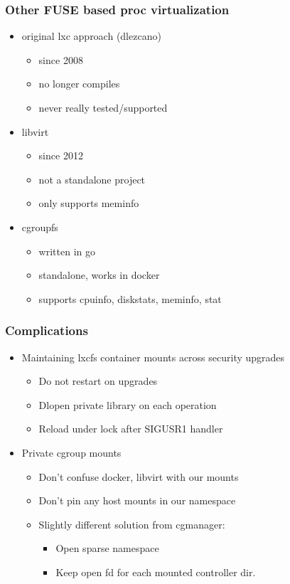 \documentclass{beamer}
\begin{document}
\begin{frame}
\frametitle{Other FUSE based proc virtualization}
	\begin{itemize}
	\item original lxc approach (dlezcano)
		\begin{itemize}
		\item since 2008
		\item no longer compiles
		\item never really tested/supported
		\end{itemize}
	\item libvirt
		\begin{itemize}
		\item since 2012
		\item not a standalone project
		\item only supports meminfo
		\end{itemize}
	\item cgroupfs
		\begin{itemize}
		\item written in go
		\item standalone, works in docker
		\item supports cpuinfo, diskstats, meminfo, stat
		\end{itemize}
	\end{itemize}
\end{frame}

\begin{frame}
\frametitle{Complications}
	\begin{itemize}
	\item Maintaining lxcfs container mounts across security upgrades
		\begin{itemize}
		\item Do not restart on upgrades
		\item Dlopen private library on each operation
		\item Reload under lock after SIGUSR1 handler
		\end{itemize}
	\item Private cgroup mounts
		\begin{itemize}
		\item Don't confuse docker, libvirt with our mounts
		\item Don't pin any host mounts in our namespace
		\item Slightly different solution from cgmanager:
			\begin{itemize}
			\item Open sparse namespace
			\item Keep open fd for each mounted controller dir.
			\end{itemize}
		\end{itemize}
	\end{itemize}
\end{frame}
\end{document}
